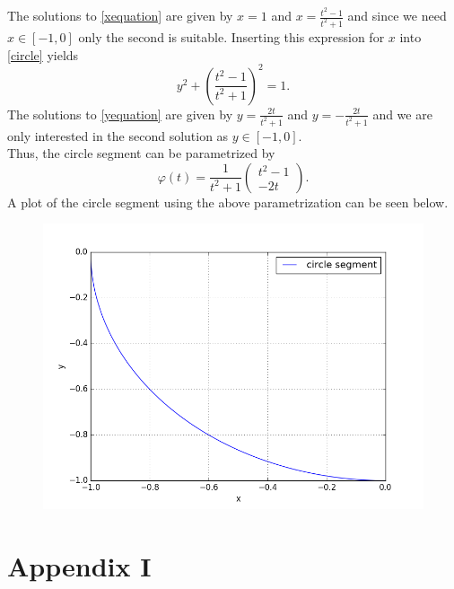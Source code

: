 \documentclass[]{article}
\begin{document}
The solutions to \eqref{xequation} are given by $x=1$ and $x=\frac{t^2 - 1}{t^2 + 1}$ and since we need $x\in [-1, 0]$ only the second is suitable. Inserting this expression for $x$ into \eqref{circle} yields\begin{equation}\label{yequation}
y^2 + \left(\frac{t^2 - 1}{t^2 + 1}\right)^2 = 1.
\end{equation}
The solutions to \eqref{yequation} are given by $y=\frac{2t}{t^2 + 1}$ and $y=-\frac{2t}{t^2 + 1}$ and we are only interested in the second solution as $y\in[-1, 0]$.\\
Thus, the circle segment can be parametrized by \begin{equation*}
\varphi(t)=\frac{1}{t^2 + 1}\left(\begin{array}{c}
t^2 - 1\\
-2t
\end{array}\right).
\end{equation*}
A plot of the circle segment using the above parametrization can be seen below.
\begin{figure}[h!]
	\includegraphics[scale=0.6]{circlesegment}
\end{figure}
\section*{Appendix I}
%
\end{document}
